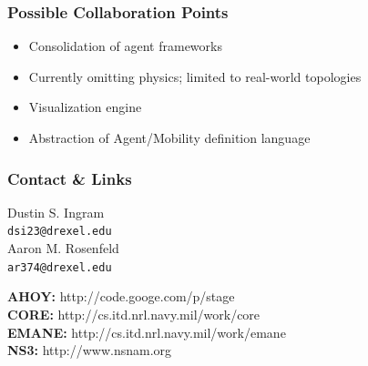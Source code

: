 \documentclass[mathserif]{beamer}
\begin{document}
\frame
{
    \frametitle{Possible Collaboration Points}
    \begin{itemize}
	\item Consolidation of agent frameworks
	\item Currently omitting physics; limited to real-world topologies
	\item Visualization engine
	\item Abstraction of Agent/Mobility definition language
    \end{itemize}
}

\frame
{
    \frametitle{Contact \& Links}
    \begin{center}
	Dustin S. Ingram\\
	\texttt{dsi23@drexel.edu} \\

	Aaron M. Rosenfeld \\
	\texttt{ar374@drexel.edu} \\
    \end{center}

    \textbf{AHOY:} http://code.googe.com/p/stage \\
    \textbf{CORE:} http://cs.itd.nrl.navy.mil/work/core \\
    \textbf{EMANE:} http://cs.itd.nrl.navy.mil/work/emane \\
    \textbf{NS3:} http://www.nsnam.org  \\
}
\end{document}

